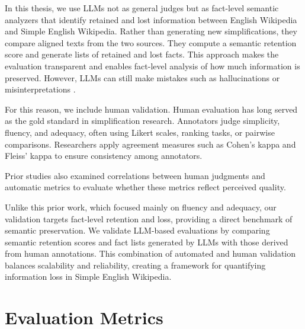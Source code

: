 \documentclass{DESSThesis}
\begin{document}
In this thesis, we use LLMs not as general judges but as fact-level semantic analyzers that identify retained and lost information between English Wikipedia and Simple English Wikipedia. Rather than generating new simplifications, they compare aligned texts from the two sources. They compute a semantic retention score and generate lists of retained and lost facts. This approach makes the evaluation transparent and enables fact-level analysis of how much information is preserved. However, LLMs can still make mistakes such as hallucinations or misinterpretations \cite{farquhar2024detecting, huang2025survey, asgari2025framework, sawczyn2025factselfcheckfactlevelblackboxhallucination}.

For this reason, we include human validation. Human evaluation has long served as the gold standard in simplification research. Annotators judge simplicity\cite{carrer2024towards, alfear2024meta}, fluency\cite{carrer2024towards, alfear2024meta}, and adequacy\cite{carrer2024towards, alfear2024meta, agrawal2024text}, often using Likert scales\cite{stodden2021scale,scialom2021rethinkingautomaticevaluationsentence, carrer2024towards, alfear2024meta}, ranking tasks\cite{specia2012semeval}, or pairwise comparisons\cite{maddela2022lens}. Researchers apply agreement measures such as Cohen’s kappa\cite{cohen1960coefficient} and Fleiss’ kappa\cite{fleiss1971measuring} to ensure consistency among annotators\cite{mchugh2012interrater, bhowmick2008agreement}.

Prior studies also examined correlations between human judgments and automatic metrics to evaluate whether these metrics reflect perceived quality\cite{papineni2002bleu, 10.1162/coli_a_00418, scialom2021rethinkingautomaticevaluationsentence, maddela2022lens, beauchemin2023meaningbert, alfear2024meta}. 

Unlike this prior work, which focused mainly on fluency and adequacy, our validation targets fact-level retention and loss, providing a direct benchmark of semantic preservation. We validate LLM-based evaluations by comparing semantic retention scores and fact lists generated by LLMs with those derived from human annotations. This combination of automated and human validation balances scalability and reliability, creating a framework for quantifying information loss in Simple English Wikipedia.


\section{Evaluation Metrics}\\
\end{document}
